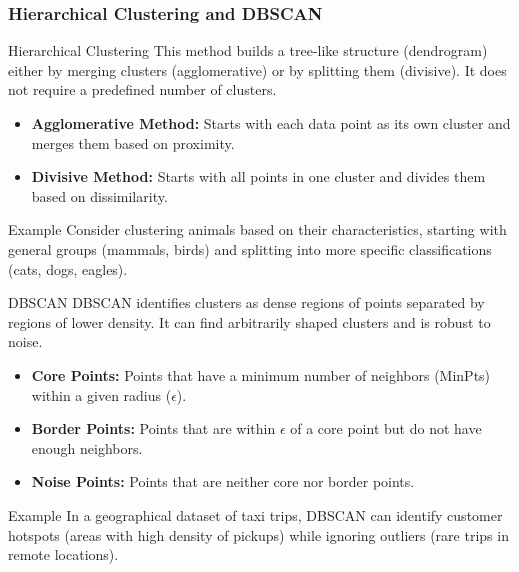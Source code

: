 \documentclass[aspectratio=169]{beamer}
\begin{document}
\begin{frame}[fragile]
  \frametitle{Hierarchical Clustering and DBSCAN}
  \begin{block}{Hierarchical Clustering}
    This method builds a tree-like structure (dendrogram) either by merging clusters (agglomerative) or by splitting them (divisive). It does not require a predefined number of clusters.
  \end{block}
  \begin{itemize}
    \item \textbf{Agglomerative Method:} Starts with each data point as its own cluster and merges them based on proximity.
    \item \textbf{Divisive Method:} Starts with all points in one cluster and divides them based on dissimilarity.
  \end{itemize}
  \begin{block}{Example}
    Consider clustering animals based on their characteristics, starting with general groups (mammals, birds) and splitting into more specific classifications (cats, dogs, eagles).
  \end{block}

  \begin{block}{DBSCAN}
    DBSCAN identifies clusters as dense regions of points separated by regions of lower density. It can find arbitrarily shaped clusters and is robust to noise.
  \end{block}
  \begin{itemize}
    \item \textbf{Core Points:} Points that have a minimum number of neighbors (MinPts) within a given radius ($\epsilon$).
    \item \textbf{Border Points:} Points that are within $\epsilon$ of a core point but do not have enough neighbors.
    \item \textbf{Noise Points:} Points that are neither core nor border points.
  \end{itemize}
  \begin{block}{Example}
    In a geographical dataset of taxi trips, DBSCAN can identify customer hotspots (areas with high density of pickups) while ignoring outliers (rare trips in remote locations).
  \end{block}
\end{frame}
\end{document}
